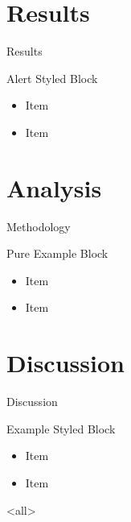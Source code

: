 \section{Results}
\begin{frame}{Results}
  \begin{alertblock}{Alert Styled Block}
    \begin{itemize}
    \item Item
    \item Item
    \end{itemize}
  \end{alertblock}
\end{frame}

\lipsum[5-7]

\section{Analysis}
\begin{frame}{Methodology}
  \begin{example}{Pure Example Block}
    \begin{itemize}
    \item Item
    \item Item
    \end{itemize}
  \end{example}
\end{frame}

\section{Discussion}
\begin{frame}{Discussion}
  \begin{exampleblock}{Example Styled Block}
    \begin{itemize}
    \item Item
    \item Item
    \end{itemize}
  \end{exampleblock}
\end{frame}

\lipsum

\mode<all>




